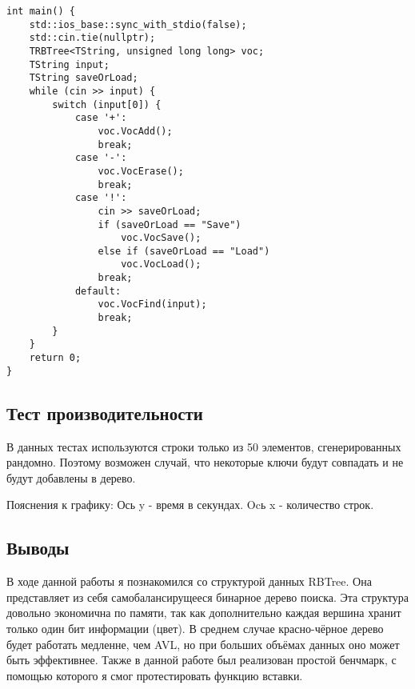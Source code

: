 \documentclass[12pt]{article}
\begin{document}
\begin{verbatim}
int main() {
    std::ios_base::sync_with_stdio(false);
    std::cin.tie(nullptr);
    TRBTree<TString, unsigned long long> voc;
    TString input;
    TString saveOrLoad;
    while (cin >> input) {
        switch (input[0]) {
            case '+':
                voc.VocAdd();
                break;
            case '-':
                voc.VocErase();
                break;
            case '!':
                cin >> saveOrLoad;
                if (saveOrLoad == "Save")
                    voc.VocSave();
                else if (saveOrLoad == "Load")
                    voc.VocLoad();
                break;
            default:
                voc.VocFind(input);
                break;
        }
    }
    return 0;
}
\end{verbatim}

\subsection*{Тест производительности}

В данных тестах используются строки только из 50 элементов, сгенерированных рандомно. Поэтому возможен случай, что некоторые ключи будут совпадать и не будут добавлены в дерево.

\newline
Пояснения к графику:
Ось y - время в секундах. Ocь x - количество строк. \newline 

\subsection*{Выводы}

В ходе данной работы я познакомился со структурой данных RBTree. Она представляет из себя самобалансирущееся бинарное дерево поиска. Эта структура довольно экономична по памяти, так как дополнительно каждая вершина хранит только один бит информации (цвет). В среднем случае красно-чёрное дерево будет работать медленне, чем AVL, но при больших объёмах данных оно может быть эффективнее. Также в данной работе был реализован простой бенчмарк, с помощью которого я смог протестировать функцию вставки.
\end{document}
